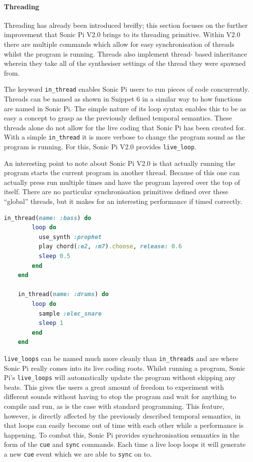 \documentclass[11pt]{scrartcl}
\begin{document}
\paragraph{Threading}

Threading has already been introduced breifly; this section focuses on the 
further improvement that Sonic Pi V2.0 brings to its threading primitive. 
Within V2.0 there are multiple commands which allow for easy synchronisation 
of threads whilst the program is running. Threads also implement thread-
based inheritance wherein they take all of the synthesiser settings of the 
thread they were spawned from.

The keyword \texttt{in\_thread} enables Sonic Pi users to run pieces of 
code concurrently. Threads can be named as shown in Snippet 6 in a similar way 
to how functions are named in Sonic Pi. The simple nature of its loop syntax 
enables this to be as easy a concept to grasp as the previously defined 
temporal semantics. These threads alone do not allow for the live coding that 
Sonic Pi has been created for. With a simple \texttt{in\_thread} it is more 
verbose to change the program sound as the program is running. For this, Sonic 
Pi V2.0 provides \texttt{live\_loop}.

An interesting point to note about Sonic Pi V2.0 is that actually running the 
program starts the current program in another thread. Because of this one can 
actually press run multiple times and have the program layered over the top of 
itself. There are no particular synchronisation primitives defined over these 
``global'' threads, but it makes for an interesting performance if timed 
correctly.

\begin{minipage}{\textwidth}
	\begin{lstlisting}[language = ruby]
    in_thread(name: :bass) do
        loop do
          use_synth :prophet
          play chord(:e2, :m7).choose, release: 0.6
          sleep 0.5
        end
    end

    in_thread(name: :drums) do
        loop do
          sample :elec_snare
          sleep 1
        end
    end
	\end{lstlisting}
\end{minipage}

\texttt{live\_loops} can be named much more cleanly than \texttt{in\_threads} 
and are where Sonic Pi really comes into its live coding roots. Whilst 
running a program, Sonic Pi's \texttt{live\_loops} will automatically update 
the program without skipping any beats. This gives the users a great amount of 
freedom to experiment with different sounds without having to stop the program 
and wait for anything to compile and run, as is the case with standard 
programming. This feature, however, is directly affected by the previously 
described temporal semantics, in that loops can easily become out of time with 
each other while a performance is happening. To combat this, Sonic Pi provides 
synchronisation semantics in the form of the \texttt{cue} and \texttt{sync} 
commands. Each time a live loop loops it will generate a new \texttt{cue} 
event which we are able to \texttt{sync} on to. 
\end{document}
